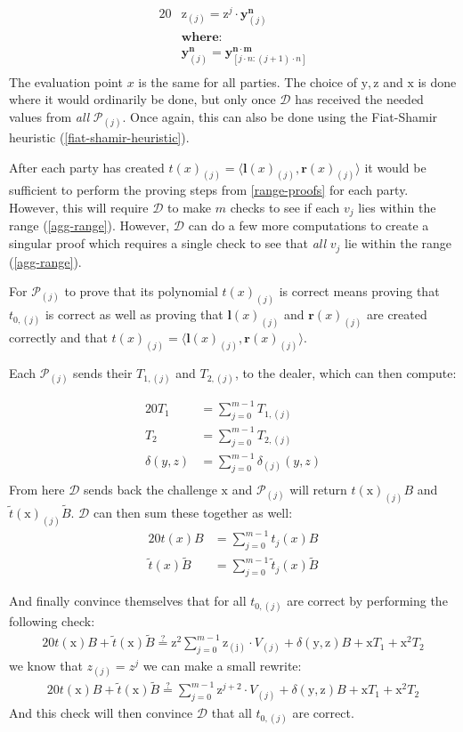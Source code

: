 \documentclass{article}
\newcommand{\eq}[1]{\begin{alignat*}{20}#1\end{alignat*}}
\renewcommand{\vec}[1]{\boldsymbol{#1}}
\newcommand{\ran}[1]{\mathrm{#1}}
\newcommand{\vecran}[1]{\mathbf{#1}}
\renewcommand{\P}{\mathcal{P}}
\newcommand{\D}{\mathcal{D}}
\newcommand{\dotp}[2]{\langle #1, #2 \rangle}
\newcommand{\blind}[1]{\widetilde{#1}}
\newcommand{\bt}{\blind{t}}
\newcommand{\bB}{\blind{B}}
\begin{document}
\eq{
	&\ran{z}_{(j)}   = \ran{z}^j \cdot \vecran{y}^{\vec{n}}_{(j)} \\
	&\textbf{where:}\\
	&\vecran{y}^{\vec{n}}_{(j)} = \vecran{y}^{\vec{n \cdot m}}_{[j \cdot n:(j+1) \cdot n]} \\
}
The evaluation point $x$ is the same for all parties. The choice
of $\ran{y}, \ran{z}$ and $\ran{x}$ is done where it would ordinarily
be done, but only once $\D$ has received the needed values from \textit{all}
$\P_{(j)}$. Once again, this can also be done using the Fiat-Shamir
heuristic (\ref{fiat-shamir-heuristic}).

After each party has created $t(x)_{(j)} =
\dotp{\vec{l}(x)_{(j)}}{\vec{r}(x)_{(j)}}$ it would be sufficient
to perform the proving steps from \ref{range-proofs} for each
party. However, this will require $\D$ to make $m$ checks to see if
each $v_j$ lies within the range (\ref{agg-range}). However, $\D$ can
do a few more computations to create a singular proof which requires
a single check to see that \textit{all} $v_j$ lie within the range
(\ref{agg-range}).

For $\P_{(j)}$ to prove that its polynomial $t(x)_{(j)}$ is correct
means proving that $t_{0,(j)}$ is correct as well as proving that
$\vec{l}(x)_{(j)}$ and $\vec{r}(x)_{(j)}$ are created correctly and
that $t(x)_{(j)} = \dotp{\vec{l}(x)_{(j)}}{\vec{r}(x)_{(j)}}$.

\newpage

Each $\P_{(j)}$ sends their $T_{1,(j)}$ and $T_{2,(j)}$, to the dealer,
which can then compute:

\eq{
	T_1 &= \sum^{m-1}_{j = 0} T_{1,(j)}\\
	T_2 &= \sum^{m-1}_{j = 0} T_{2,(j)}\\
	\delta(y,z) &= \sum^{m-1}_{j = 0} \delta_{(j)}(y,z) \\
}
From here $\D$ sends back the challenge $\ran{x}$ and $\P_{(j)}$
will return $t(\ran{x})_{(j)}B$ and $\bt(\ran{x})_{(j)}\bB$. $\D$
can then sum these together as well:
\eq{
t(x)B &= \sum^{m-1}_{j = 0} t_{j}(x)B\\
\bt(x)\bB &= \sum^{m-1}_{j = 0} \bt_{j}(x)\bB
}

And finally convince themselves that for all $t_{0,(j)}$ are correct
by performing the following check:
\eq{
	t(\ran{x})B + \bt (\ran{x})\bB \stackrel{?}{=}
	\ran{z^2}\sum^{m-1}_{j = 0} \ran{z_{(j)}} \cdot V_{(j)} +
	\delta(\ran{y},\ran{z})B + \ran{x}T_1 + \ran{x^2}T_2
}
we know that $z_{(j)} = z^j$ we can make a small rewrite:
\eq{
	t(\ran{x})B + \bt (\ran{x})\bB \stackrel{?}{=}
	\sum^{m-1}_{j = 0} \ran{z}^{j+2} \cdot V_{(j)} +
	\delta(\ran{y},\ran{z})B + \ran{x}T_1 + \ran{x^2}T_2
}
And this check will then convince $\D$ that all $t_{0,(j)}$
are correct.
\end{document}
